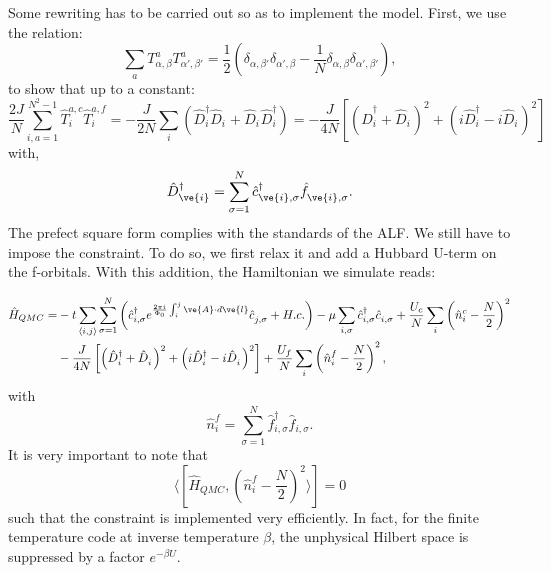 Some  rewriting has to be carried out so as to implement  the model.   First, we  use the  relation:
\begin{equation*}
	\sum_{a} T^{a}_{\alpha,\beta} T^{a}_{\alpha',\beta'} = \frac{1}{2} \left(  \delta_{\alpha,\beta'}  \delta_{\alpha',\beta} - \frac{1}{N} \delta_{\alpha,\beta} \delta_{\alpha', \beta'} \right), 
\end{equation*}
to  show that up to a constant: 
\begin{equation}
	 \frac{2 J}{N} \sum_{i, a=1  }^{N^2 -1}  \hat{T}^{a,c}_{i}  \hat{T}^{a,f}_{i}  =   - \frac{J}{2N} \sum_{i}  \left( 
                \hat{D}^{\dagger}_{i} \hat{D}^{\phantom\dagger}_{i}   +    \hat{D}^{\phantom\dagger}_{i} \hat{D}^{\dagger}_{i}    \right)    
                =   -  \frac{J}{4N}    \left[ \left(   \hat{D}^{\dagger}_{i}  + \hat{D}^{\phantom\dagger}_{i}    \right)^{2}  + 
                                                       \left(  i\hat{D}^{\dagger}_{i}  - i  \hat{D}^{\phantom\dagger}_{i}    \right)^2  \right]
 \end{equation}
with, 
\begin{equation*}
	   \hat{D}^{\dagger}_{\ve{i}}   =  \sum_{\sigma=1}^{N} \hat{c}^{\dagger}_{\ve{i},\sigma}  \hat{f}^{\phantom\dagger}_{\ve{i},\sigma}.
\end{equation*}
The  prefect square form  complies with the standards of the ALF.      We still have to impose the constraint. To do so, we first relax it and add a Hubbard  U-term on  the f-orbitals.    With this addition, the Hamiltonian we simulate reads: 

\begin{align}
	\hat{H}_{QMC}      =  &   - t  \sum_{\langle i,j \rangle}    \sum_{\sigma=1}^{N}  \left(  \hat{c}^{\dagger}_{i,\sigma}  e^{\frac{2\pi i}{\Phi_0}  \int_{i}^{j} \ve{A}\cdot d \ve{l}}\hat{c}^{\phantom\dagger}_{j,\sigma}   + H.c.  \right)  - \mu \sum_{i,\sigma} \hat{c}^{\dagger}_{i,\sigma}  \hat{c}^{\phantom\dagger}_{i,\sigma} 
	+    \frac{U_c}{N}  \sum_{i}   \left( \hat{n}^c_i -  \frac{N}{2} \right)^2   \nonumber \\
          & -  \frac{J}{4N}    \left[ \left(   \hat{D}^{\dagger}_{i}  + \hat{D}^{\phantom\dagger}_{i}    \right)^{2}  + 
                                                       \left(  i\hat{D}^{\dagger}_{i}  - i  \hat{D}^{\phantom\dagger}_{i}    \right)^2  \right]  
       +    \frac{U_f}{N}  \sum_{i}   \left( \hat{n}^f_i -  \frac{N}{2} \right)^2,   
\label{Kondo_SUN_Ham_QMC.eq}
\end{align}
with 
\begin{equation*}
 \hat{n}^f_i  = \sum_{\sigma=1}^{N} \hat{f}_{i,\sigma}^{\dagger} \hat{f}_{i,\sigma}^{\phantom\dagger}.
\end{equation*}
It is very important to note that 
\begin{equation}
	\langle[   \hat{H}_{QMC},  \left( \hat{n}^f_i -  \frac{N}{2} \right)^2  \rangle]    = 0  
\end{equation}
such that the  constraint is implemented very efficiently.  In fact, for the finite temperature code  at inverse temperature $\beta$,  the unphysical Hilbert space   is suppressed by a  
factor  $e^{-\beta U} $. 



